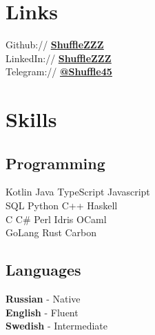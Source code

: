 \documentclass[]{resume}
\begin{document}
\begin{minipage}[t]{0.33\textwidth}

\section{Links} 
Github:// \href{https://github.com/ShuffleZZZ} {\underline {\bf ShuffleZZZ}} \\
LinkedIn://  \href{https://www.linkedin.com/in/ShuffleZZZ/}{\underline {\bf ShuffleZZZ}} \\
Telegram://  \href{https://t.me/Shuffle45}{\underline {\bf @Shuffle45}} \\


\section{Skills}
\subsection{Programming}
Kotlin \textbullet{} Java \textbullet{} TypeScript \textbullet{} Javascript \\
SQL \textbullet{} Python \textbullet{} C++ \textbullet{} Haskell \\
C \textbullet{} C\# \textbullet{} Perl \textbullet{} Idris \textbullet{} OCaml \\
GoLang \textbullet{} Rust \textbullet{} Carbon
\sectionsep
\subsection{Languages}
{\bf Russian} - Native \\
{\bf English} - Fluent \\
{\bf Swedish} - Intermediate
\sectionsep

%
%

\end{minipage} 
\hfill
\end{document}
